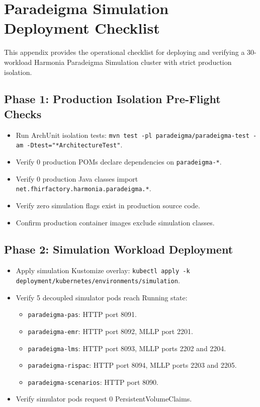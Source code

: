 
\chapter{Paradeigma Simulation Deployment Checklist}
\label{app:paradeigma_checklist}

This appendix provides the operational checklist for deploying and verifying a 30-workload Harmonia Paradeigma Simulation cluster with strict production isolation.

\section{Phase 1: Production Isolation Pre-Flight Checks}
\begin{itemize}[label=$\square$]
    \item Run ArchUnit isolation tests: \nolinkurl{mvn test -pl paradeigma/paradeigma-test -am -Dtest="*ArchitectureTest"}.
    \item Verify 0 production POMs declare dependencies on \nolinkurl{paradeigma-*}.
    \item Verify 0 production Java classes import \nolinkurl{net.fhirfactory.harmonia.paradeigma.*}.
    \item Verify zero simulation flags exist in production source code.
    \item Confirm production container images exclude simulation classes.
\end{itemize}

\section{Phase 2: Simulation Workload Deployment}
\begin{itemize}[label=$\square$]
    \item Apply simulation Kustomize overlay: \nolinkurl{kubectl apply -k deployment/kubernetes/environments/simulation}.
    \item Verify 5 decoupled simulator pods reach Running state:
    \begin{itemize}
        \item \nolinkurl{paradeigma-pas}: HTTP port 8091.
        \item \nolinkurl{paradeigma-emr}: HTTP port 8092, MLLP port 2201.
        \item \nolinkurl{paradeigma-lms}: HTTP port 8093, MLLP ports 2202 and 2204.
        \item \nolinkurl{paradeigma-rispac}: HTTP port 8094, MLLP ports 2203 and 2205.
        \item \nolinkurl{paradeigma-scenarios}: HTTP port 8090.
    \end{itemize}
    \item Verify simulator pods request 0 PersistentVolumeClaims.
\end{itemize}

